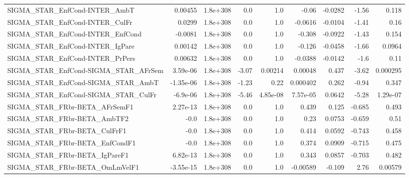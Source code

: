 \begin{tabular}{lrrrrrrrr}
SIGMA\_STAR\_EnfCond-INTER\_AmbT         &     0.00455 &     1.8e+308 &     0.0 &      1.0 &      -0.06 &     -0.0282 &        -1.56 &         0.118 \\
SIGMA\_STAR\_EnfCond-INTER\_CulFr        &      0.0299 &     1.8e+308 &     0.0 &      1.0 &    -0.0616 &     -0.0104 &        -1.41 &          0.16 \\
SIGMA\_STAR\_EnfCond-INTER\_EnfCond      &     -0.0081 &     1.8e+308 &     0.0 &      1.0 &     -0.308 &     -0.0922 &        -1.43 &         0.154 \\
SIGMA\_STAR\_EnfCond-INTER\_IgPare       &     0.00142 &     1.8e+308 &     0.0 &      1.0 &     -0.126 &     -0.0458 &        -1.66 &        0.0964 \\
SIGMA\_STAR\_EnfCond-INTER\_PrPers       &     0.00632 &     1.8e+308 &     0.0 &      1.0 &    -0.0388 &     -0.0142 &         -1.6 &          0.11 \\
SIGMA\_STAR\_EnfCond-SIGMA\_STAR\_AFrSem  &    3.59e-06 &     1.8e+308 &   -3.07 &  0.00214 &    0.00048 &       0.437 &        -3.62 &      0.000295 \\
SIGMA\_STAR\_EnfCond-SIGMA\_STAR\_AmbT    &   -1.35e-06 &     1.8e+308 &   -1.23 &     0.22 &   0.000402 &       0.262 &        -0.94 &         0.347 \\
SIGMA\_STAR\_EnfCond-SIGMA\_STAR\_CulFr   &    -6.9e-06 &     1.8e+308 &   -5.46 & 4.85e-08 &   7.57e-05 &      0.0642 &        -5.28 &      1.29e-07 \\
SIGMA\_STAR\_FRbr-BETA\_AFrSemF1         &    2.27e-13 &     1.8e+308 &     0.0 &      1.0 &      0.439 &       0.125 &       -0.685 &         0.493 \\
SIGMA\_STAR\_FRbr-BETA\_AmbTF2           &        -0.0 &     1.8e+308 &     0.0 &      1.0 &       0.23 &      0.0753 &       -0.659 &          0.51 \\
SIGMA\_STAR\_FRbr-BETA\_CulFrF1          &        -0.0 &     1.8e+308 &     0.0 &      1.0 &      0.414 &      0.0592 &       -0.743 &         0.458 \\
SIGMA\_STAR\_FRbr-BETA\_EnfCondF1        &        -0.0 &     1.8e+308 &     0.0 &      1.0 &      0.374 &      0.0909 &       -0.715 &         0.475 \\
SIGMA\_STAR\_FRbr-BETA\_IgPareF1         &    6.82e-13 &     1.8e+308 &     0.0 &      1.0 &      0.343 &      0.0857 &       -0.703 &         0.482 \\
SIGMA\_STAR\_FRbr-BETA\_OmLmVelF1        &   -3.55e-15 &     1.8e+308 &     0.0 &      1.0 &   -0.00589 &      -0.109 &         2.76 &       0.00579 \\

\end{tabular}
